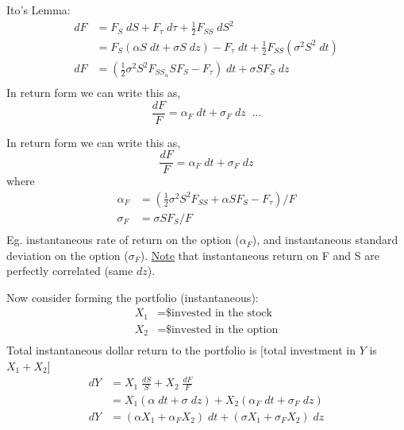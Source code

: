 \documentclass[
14pt,notheorems,hyperref={pdfauthor=whatever}
]{beamer}
\begin{document}
\begin{frame}
Ito's Lemma:\\
\hfill\break
\begin{align*}
    dF &= F_S\;dS+F_\tau\;d\tau+\frac{1}{2}F_{SS}\;dS^2\\
    &= F_S(\alpha S\;dt+\sigma S\;dz)-F_\tau \;dt + \frac{1}{2}F_{SS}(\sigma^2 S^2\;dt)\\
    dF &= (\frac{1}{2}\sigma^2 S^2 F_{SS}_\alpha S F_S - F_\tau)\;dt + \sigma S F_S \;dz\\
\end{align*}
In return form we can write this as,\\
\[\frac{dF}{F} = \alpha_F\;dt+\sigma_F\;dz \;\;\text{...}\]
\end{frame}

\begin{frame}
In return form we can write this as,\\
\[\frac{dF}{F} = \alpha_F\;dt+\sigma_F\;dz\]
where\\
\begin{align*}
    \alpha_F &= (\frac{1}{2} \sigma^2 S^2 F_{SS} + \alpha S F_S - F_\tau) / F\\
    \sigma_F &= \sigma S F_S / F\\
\end{align*}
Eg. instantaneous rate of return on the option ($\alpha_F$), and instantaneous standard deviation on the option ($\sigma_F$). \underline{Note} that instantaneous return on F and S are perfectly correlated (same $dz$).\\
\end{frame}

\begin{frame}
Now consider forming the portfolio (instantaneous):
\begin{align*}
    X_1 &= \text{\$ invested in the stock}\\
    X_2 &= \text{\$ invested in the option}\\
\end{align*}
Total instantaneous dollar return to the portfolio is [total investment in $Y$ is $X_1+X_2$]\\
\begin{align*}
    dY &= X_1\;\frac{dS}{S}+X_2\;\frac{dF}{F}\\
    &= X_1(\alpha\;dt + \sigma\;dz)+X_2(\alpha_F\;dt + \sigma_F\;dz)\\
    dY &= (\alpha X_1 + \alpha_F X_2)\;dt+(\sigma X_1 + \sigma_F X_2)\;dz\\
\end{align*}
\end{frame}
\end{document}
